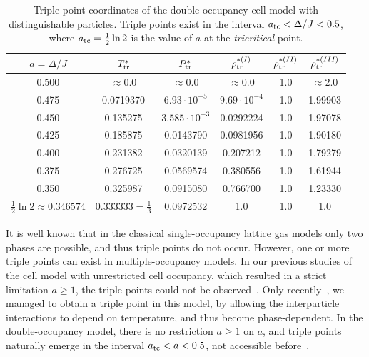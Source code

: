 \documentclass[pdflatex,sn-mathphys-num]{sn-jnl}%
\theoremstyle{thmstyleone}%
\theoremstyle{thmstyletwo}%
\theoremstyle{thmstylethree}%
\begin{document}
	\begin{table}[h]
		\centering
		\caption{Triple-point coordinates of the double-occupancy cell model with distinguishable particles. Triple points exist in the interval $a_{\rm tc} < \Delta/J < 0.5$, where $a_{\rm tc} = \frac{1}{2} \ln 2$ is the value of $a$ at the \emph{tricritical} point.}
		\begin{tabular}{c|c|c|c|c|c}
			\toprule
			$a=\Delta/J$ & $T^*_{\rm tr}$ & $P^*_{\rm tr}$ & $\rho^{*(I)}_{\rm tr}$ & $\rho^{*(II)}_{\rm tr}$ & $\rho^{*(III)}_{\rm tr}$ \\
			\midrule
			0.500 & $\approx 0.0$ & $\approx 0.0$ & $\approx 0.0$ & 1.0 & $\approx 2.0$ \\
			0.475 & 0.0719370 & $6.93 \cdot 10^{-5}$ & $9.69 \cdot 10^{-4}$  & 1.0 & 1.99903 \\
			0.450 & 0.135275 & $3.585 \cdot 10^{-3}$ & 0.0292224 & 1.0 & 1.97078 \\
			0.425 & 0.185875 & 0.0143790 & 0.0981956 & 1.0 & 1.90180 \\
			0.400 & 0.231382 & 0.0320139 & 0.207212 & 1.0 & 1.79279 \\
			0.375 & 0.276725 & 0.0569574 & 0.380556 & 1.0 & 1.61944 \\
			0.350 & 0.325987 & 0.0915080 & 0.766700 & 1.0 & 1.23330 \\
			$\frac{1}{2}\ln 2 \approx 0.346574$ & $0.333333 = \frac{1}{3}$ & 0.0972532 & 1.0 & 1.0 & 1.0 \\
			\bottomrule
		\end{tabular}
		\label{tab:triple-line}
	\end{table}
	
	It is well known that in the classical single-occupancy lattice gas models only two phases are possible, and thus triple points do not occur. However, one or more triple points can exist in multiple-occupancy models. In our previous studies of the cell model with unrestricted cell occupancy, which resulted in a strict limitation $a \geq 1$, the triple points could not be observed~\cite{KKD20,KD22,DKPP26}.
	Only recently~\cite{KDPRS26}, we managed to obtain a triple point in this model, by allowing the interparticle interactions to depend on temperature, and thus become phase-dependent.
	In the double-occupancy model, there is no restriction $a \geq 1$ on $a$, and triple points naturally emerge in the interval $a_{\rm tc} < a < 0.5$, not accessible before~\cite{KKD20,KD22,DKPP26}.
	
\end{document}
